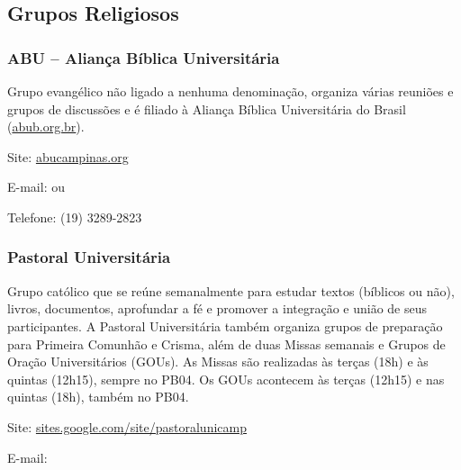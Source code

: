 \subsection{Grupos Religiosos}

\subsubsection*{ABU -- Aliança Bíblica Universitária}

Grupo evangélico não ligado a nenhuma denominação, organiza várias reuniões e
grupos de discussões e é filiado à Aliança Bíblica Universitária do Brasil
(\url{abub.org.br}).

\begin{compactitemize}
    \item Site: \url{abucampinas.org}
    \item E-mail:  ou
    \item Telefone: (19) 3289-2823
\end{compactitemize}

\subsubsection*{Pastoral Universitária}

Grupo católico que se reúne semanalmente para estudar textos (bíblicos ou não),
livros, documentos, aprofundar a fé e promover a integração e união de seus
participantes. A Pastoral Universitária também organiza grupos de preparação
para Primeira Comunhão e Crisma, além de duas Missas semanais e Grupos de Oração
Universitários (GOUs). As Missas são realizadas às terças (18h) e às quintas
(12h15), sempre no PB04. Os GOUs acontecem às terças (12h15) e nas quintas
(18h), também no PB04.

\begin{compactitemize}
    \item Site: \url{sites.google.com/site/pastoralunicamp}
    \item E-mail: 
\end{compactitemize}
